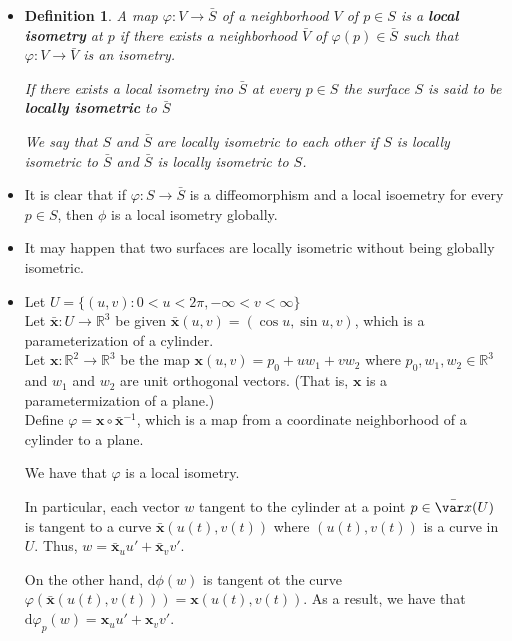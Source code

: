\documentclass[10pt]{article}
\newtheorem{definition}[lemma]{Definition}
\newcommand{\dee}{\mathrm{d}}
\newcommand{\ve}[1]{\mathbf{#1}}
\newcommand{\ra}{\rightarrow}
\newcommand{\Real}{\mathbb{R}}
\begin{document}
\begin{itemize}
    \item \begin{definition}
      A map $\varphi: V \ra \bar S$ of a neighborhood $V$ of $p \in S$ is a {\bf local isometry} at $p$ if there exists a neighborhood $\bar V$ of $\varphi(p) \in \bar S$ such that $\varphi : V \ra \bar V$ is an isometry.

      If there exists a local isometry ino $\bar S$ at every $p \in S$ the surface $S$ is said to be {\bf locally isometric} to $\bar S$

      We say that $S$ and $\bar S$ are locally isometric to each other if $S$ is locally isometric to $\bar S$ and $\bar S$ is locally isometric to $S$.
    \end{definition}

    \item It is clear that if $\varphi : S \ra \bar S$ is a diffeomorphism and a local isoemetry for every $p \in S$, then $\phi$ is a local isometry globally.

    \item It may happen that two surfaces are locally isometric without being globally isometric.

    \item Let $U = \{ (u,v) : 0 < u < 2\pi, -\infty < v < \infty \}$\\
    Let $\bar{\ve{x}}: U \ra \Real^3$ be given $\bar{\ve{x}}(u,v) = (\cos u, \sin u, v)$, which is a parameterization of a cylinder.\\
    Let $\ve{x}: \Real^2 \ra \Real^3$ be the map $\ve{x}(u,v) = p_0 + u w_1 + v w_2$ where $p_0, w_1, w_2 \in \Real^3$ and $w_1$ and $w_2$ are unit orthogonal vectors. (That is, $\ve{x}$ is a parametermization of a plane.)\\
    Define $\varphi = \ve{x} \circ \ve{\bar{x}}^{-1}$, which is a map from a coordinate neighborhood of a cylinder to a plane.

    We have that $\varphi$ is a local isometry. 

    In particular, each vector $w$ tangent to the cylinder at a point $p \in \bar{\var x}(U)$ is tangent to a curve $\bar{\ve{x}}(u(t), v(t))$ where $(u(t), v(t))$ is a curve in $U$. Thus, $w = \bar{\ve{x}}_u u' + \bar{\ve{x}}_v v'$.

    On the other hand, $\dee \phi(w)$ is tangent ot the curve $\varphi(\bar{\ve{x}}(u(t), v(t))) = \ve{x}(u(t), v(t)).$ As a result, we have that $\dee \varphi_p(w) = \ve{x}_u u' + \ve{x}_v v'$.


\end{itemize}
\end{document}
